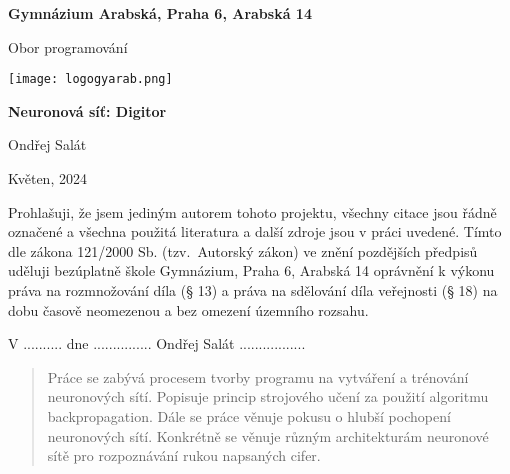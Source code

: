 \begin{titlepage}
    \begin{center}
        \large \vspace*{\fill}
        \thispagestyle{empty}

        \LARGE

        { \huge \textbf{Gymnázium Arabská, Praha 6, Arabská 14}}

        {\LARGE Obor programování }

        \vfill
        \texttt{[image: logogyarab.png]}
        \vspace{15pt}

        \vfill

        {\huge \textbf{Neuronová síť: Digitor}}

        \vfill

        Ondřej Salát

        \vfill

        {\large Květen, 2024}

        \vspace*{\fill}
    \end{center}
\end{titlepage}

\thispagestyle{empty}
\addtocounter{page}{-1}
\vspace*{\fill}
Prohlašuji, že jsem jediným autorem tohoto projektu, všechny citace jsou řádně označené a všechna
použitá literatura a další zdroje jsou v práci uvedené.
Tímto dle zákona 121/2000 Sb. (tzv.\ Autorský zákon)
ve znění pozdějších předpisů uděluji bezúplatně škole Gymnázium, Praha 6, Arabská 14 oprávnění k výkonu
práva na rozmnožování díla (§ 13) a práva na sdělování díla veřejnosti (§ 18) na dobu časově neomezenou a
bez omezení územního rozsahu.

\vspace{2cm}
V .......... dne ............... \hspace{4cm} Ondřej Salát .................

\vspace{2cm}

\newpage
\begin{abstract}
    Práce se zabývá procesem tvorby programu na vytváření a trénování neuronových sítí.
    Popisuje princip strojového učení za použití algoritmu backpropagation.
    Dále se práce věnuje pokusu o hlubší pochopení neuronových sítí.
    Konkrétně se věnuje různým architekturám neuronové sítě pro rozpoznávání rukou napsaných cifer.
\end{abstract}

\tableofcontents